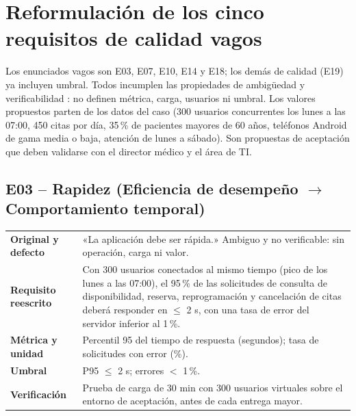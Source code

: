 \documentclass[11pt,a4paper]{article}
\begin{document}
\section{Reformulación de los cinco requisitos de calidad vagos}
Los enunciados vagos son E03, E07, E10, E14 y E18; los demás de calidad (E19) ya incluyen umbral. Todos incumplen las propiedades de ambigüedad y verificabilidad \cite{iso29148}: no definen métrica, carga, usuarios ni umbral. Los valores propuestos parten de los datos del caso (300 usuarios concurrentes los lunes a las 07:00, 450 citas por día, 35\,\% de pacientes mayores de 60 años, teléfonos Android de gama media o baja, atención de lunes a sábado). Son propuestas de aceptación que deben validarse con el director médico y el área de TI.

\begingroup
\small
\newcommand{\rqhead}[1]{\subsection*{#1}\vspace{-2pt}}

\rqhead{E03 -- Rapidez (Eficiencia de desempeño $\rightarrow$ Comportamiento temporal)}
\begin{tabularx}{\textwidth}{@{}>{\bfseries}p{3.15cm}Y@{}}
\toprule
Original y defecto & «La aplicación debe ser rápida.» Ambiguo y no verificable: sin operación, carga ni valor.\\
Requisito reescrito & Con 300 usuarios conectados al mismo tiempo (pico de los lunes a las 07:00), el 95\,\% de las solicitudes de consulta de disponibilidad, reserva, reprogramación y cancelación de citas deberá responder en $\leq$ 2 s, con una tasa de error del servidor inferior al 1\,\%.\\
Métrica y unidad & Percentil 95 del tiempo de respuesta (segundos); tasa de solicitudes con error (\%).\\
Umbral & P95 $\leq$ 2 s; errores $<$ 1\,\%.\\
Verificación & Prueba de carga de 30 min con 300 usuarios virtuales sobre el entorno de aceptación, antes de cada entrega mayor.\\
\bottomrule
\end{tabularx}
\end{document}
